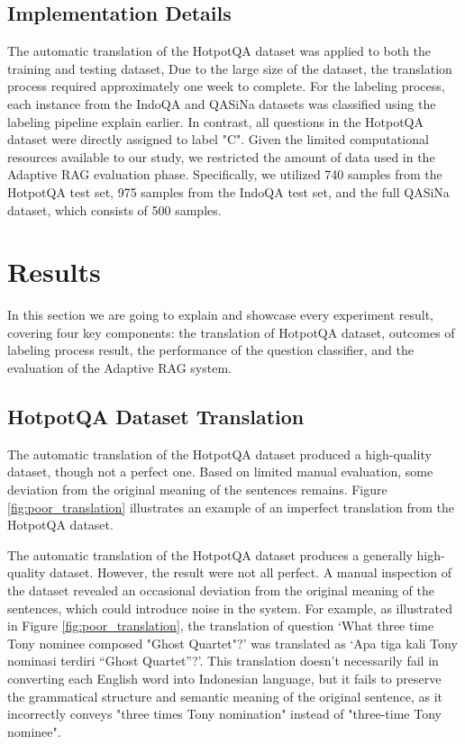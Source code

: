 \documentclass[times]{iapress}
\begin{document}
\subsection{Implementation Details}
The automatic translation of the HotpotQA dataset was applied to both the training and testing dataset, Due to the large size of the dataset, the translation process required approximately one week to complete. For the labeling process, each instance from the IndoQA and QASiNa datasets was classified using the labeling pipeline explain earlier. In contrast, all questions in the HotpotQA dataset were directly assigned to label "C". Given the limited computational resources available to our study, we restricted the amount of data used in the Adaptive RAG evaluation phase. Specifically, we utilized 740 samples from the HotpotQA test set, 975 samples from the IndoQA test set, and the full QASiNa dataset, which consists of 500 samples. 

\section{Results}
\label{sec:results}
In this section we are going to explain and showcase every experiment result, covering four key components: the translation of HotpotQA dataset, outcomes of labeling process result, the performance of the question classifier, and the evaluation of the Adaptive RAG system.

\subsection{HotpotQA Dataset Translation}
The automatic translation of the HotpotQA dataset produced a high-quality dataset, though not a perfect one. Based on limited manual evaluation, some deviation from the original meaning of the sentences remains. Figure \ref{fig:poor_translation} illustrates an example of an imperfect translation from the HotpotQA dataset.

The automatic translation of the HotpotQA dataset produces a generally high-quality dataset. However, the result were not all perfect. A manual inspection of the dataset revealed an occasional deviation from the original meaning of the sentences, which could introduce noise in the system. For example, as illustrated in Figure \ref{fig:poor_translation}, the translation of question ‘What three time Tony nominee composed "Ghost Quartet"?’ was translated as ‘Apa tiga kali Tony nominasi terdiri “Ghost Quartet”?’. This translation doesn't necessarily fail in converting each English word into Indonesian language, but it fails to preserve the grammatical structure and semantic meaning of the original sentence, as it incorrectly conveys "three times Tony nomination" instead of "three-time Tony nominee".
\end{document}
